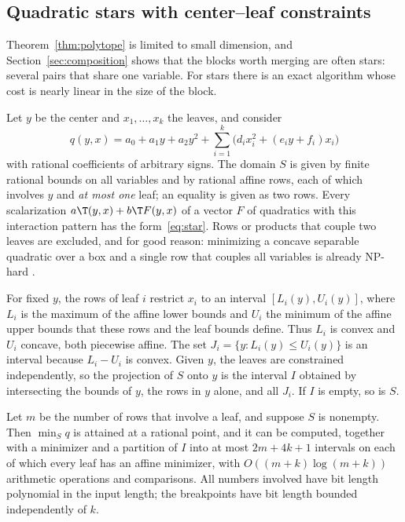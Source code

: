 \subsection{Quadratic stars with center--leaf constraints}\label{sec:star}

Theorem~\ref{thm:polytope} is limited to small dimension, and
Section~\ref{sec:composition} shows that the blocks worth merging are
often stars: several pairs that share one variable. For stars there is an
exact algorithm whose cost is nearly linear in the size of the block.

Let $y$ be the center and $x_1,\dots,x_k$ the leaves, and consider
\begin{equation}\label{eq:star}
q(y,x)=a_0+a_1y+a_2y^2+\sum_{i=1}^k\bigl(d_ix_i^2+(e_iy+f_i)x_i\bigr)
\end{equation}
with rational coefficients of arbitrary signs. The domain $S$ is given by
finite rational bounds on all variables and by rational affine rows, each
of which involves $y$ and \emph{at most one} leaf; an equality is given as
two rows. Every scalarization $a\T(y,x)+b\T F(y,x)$ of a vector $F$ of
quadratics with this interaction pattern has the form~\eqref{eq:star}.
Rows or products that couple two leaves are excluded, and for good reason:
minimizing a concave separable quadratic over a box and a single row that
couples all variables is already NP-hard \citep{MoreVavasis1990}.

For fixed $y$, the rows of leaf $i$ restrict $x_i$ to an interval
$[L_i(y),U_i(y)]$, where $L_i$ is the maximum of the affine lower bounds and
$U_i$ the minimum of the affine upper bounds that these rows and the leaf
bounds define. Thus $L_i$ is convex and $U_i$ concave, both piecewise
affine. The set $J_i=\{y:L_i(y)\le U_i(y)\}$ is an interval because $L_i-U_i$
is convex. Given $y$, the leaves are constrained independently, so the
projection of $S$ onto $y$ is the interval $I$ obtained by intersecting
the bounds of $y$, the rows in $y$ alone, and all $J_i$. If $I$ is empty,
so is $S$.

\begin{theorem}\label{thm:star}
Let $m$ be the number of rows that involve a leaf, and suppose $S$ is
nonempty. Then $\min_Sq$ is attained at a rational point, and it can be
computed, together with a minimizer and a partition of $I$ into at most
$2m+4k+1$ intervals on each of which every leaf has an affine minimizer,
with $O((m+k)\log(m+k))$ arithmetic operations and comparisons. All
numbers involved have bit length polynomial in the input length; the
breakpoints have bit length bounded independently of $k$.
\end{theorem}

